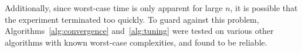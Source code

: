 Additionally, since worst-case time is only apparent for large $n$, 
it is possible that the experiment terminated too quickly.  To guard 
against this problem, Algorithms~\ref{alg:convergence} and~\ref{alg:tuning}
were tested on various other algorithms with known worst-case complexities, and 
found to be reliable.
